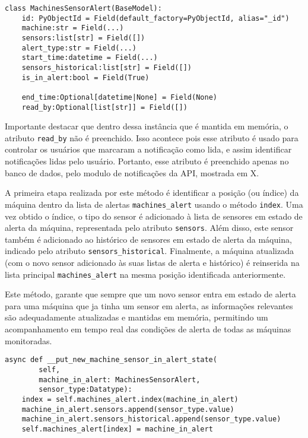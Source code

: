 \begin{verbatim}
class MachinesSensorAlert(BaseModel):
    id: PyObjectId = Field(default_factory=PyObjectId, alias="_id")
    machine:str = Field(...)
    sensors:list[str] = Field([])
    alert_type:str = Field(...)
    start_time:datetime = Field(...)
    sensors_historical:list[str] = Field([])
    is_in_alert:bool = Field(True)
    
    end_time:Optional[datetime|None] = Field(None)
    read_by:Optional[list[str]] = Field([])
\end{verbatim}

Importante destacar que dentro dessa instância que é mantida em memória, o atributo \texttt{read\_by} não é preenchido. Isso acontece pois esse atributo é usado para controlar os usuários que marcaram a notificação como lida, e assim identificar notificações lidas pelo usuário. Portanto, esse atributo é preenchido apenas no banco de dados, pelo modulo de notificações da API, mostrada em X.%

A primeira etapa realizada por este método é identificar a posição (ou índice) da máquina dentro da lista de alertas \texttt{machines\_alert} usando o método \texttt{index}. Uma vez obtido o índice, o tipo do sensor é adicionado à lista de sensores em estado de alerta da máquina, representada pelo atributo \texttt{sensors}. Além disso, este sensor também é adicionado ao histórico de sensores em estado de alerta da máquina, indicado pelo atributo \texttt{sensors\_historical}. Finalmente, a máquina atualizada (com o novo sensor adicionado às suas listas de alerta e histórico) é reinserida na lista principal \texttt{machines\_alert} na mesma posição identificada anteriormente.

Este método, garante que sempre que um novo sensor entra em estado de alerta para uma máquina que ja tinha um sensor em alerta, as informações relevantes são adequadamente atualizadas e mantidas em memória, permitindo um acompanhamento em tempo real das condições de alerta de todas as máquinas monitoradas.

\begin{verbatim}
async def __put_new_machine_sensor_in_alert_state(
        self,
        machine_in_alert: MachinesSensorAlert,
        sensor_type:Datatype):
    index = self.machines_alert.index(machine_in_alert)
    machine_in_alert.sensors.append(sensor_type.value)
    machine_in_alert.sensors_historical.append(sensor_type.value)
    self.machines_alert[index] = machine_in_alert
\end{verbatim}

